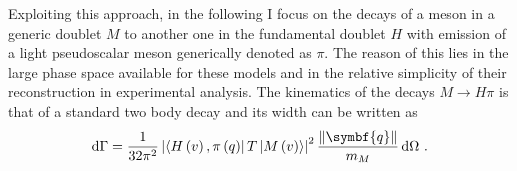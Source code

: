 Exploiting this approach, in the following I focus on the decays of a meson in a generic doublet $M$ to another one in the fundamental doublet $H$ with emission of a light pseudoscalar meson generically denoted as $\pi$. The reason of this lies in the large phase space available for these models and in the relative simplicity of their reconstruction in experimental analysis. The kinematics of the decays $M \to H \pi$ is that of a standard two body decay and its width can be written as
\begin{equation}
  \D \! \Gamma= \frac{1}{32 \pi^2} \left\vert \left\langle H \left( v \right), \pi \left( q \right) \right\vert T \left\vert M \left( v \right) \right\rangle \right\vert^2 \frac{\left\Vert \symbf{q} \right\Vert}{m_M} \D \! \Omega \ .
  \label{eq:diff_decay_width}
\end{equation}
%

